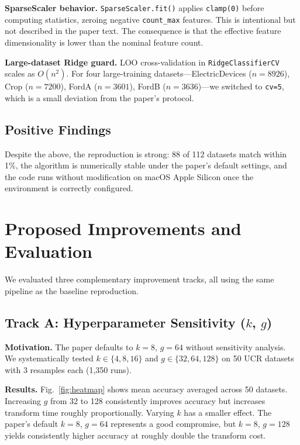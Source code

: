 \documentclass[conference]{IEEEtran}
\begin{document}
\textbf{SparseScaler behavior.}
\texttt{SparseScaler.fit()} applies \texttt{clamp(0)} before computing
statistics, zeroing negative \texttt{count\_max} features. This is
intentional but not described in the paper text. The consequence is that
the effective feature dimensionality is lower than the nominal feature count.

\textbf{Large-dataset Ridge guard.}
LOO cross-validation in \texttt{RidgeClassifierCV} scales as $O(n^2)$.
For four large-training datasets---ElectricDevices ($n{=}8926$), Crop
($n{=}7200$), FordA ($n{=}3601$), FordB ($n{=}3636$)---we switched to
\texttt{cv=5}, which is a small deviation from the paper's protocol.

\subsection{Positive Findings}

Despite the above, the reproduction is strong: 88 of 112 datasets match
within 1\%, the algorithm is numerically stable under the paper's default
settings, and the code runs without modification on macOS Apple Silicon
once the environment is correctly configured.

\section{Proposed Improvements and Evaluation}

We evaluated three complementary improvement tracks, all using the same
pipeline as the baseline reproduction.

\subsection{Track A: Hyperparameter Sensitivity ($k$, $g$)}

\textbf{Motivation.} The paper defaults to $k{=}8$, $g{=}64$ without
sensitivity analysis. We systematically tested $k \in \{4, 8, 16\}$ and
$g \in \{32, 64, 128\}$ on 50 UCR datasets with 3 resamples each (1,350
runs).

\textbf{Results.} Fig.~\ref{fig:heatmap} shows mean accuracy averaged
across 50 datasets. Increasing $g$ from 32 to 128 consistently improves
accuracy but increases transform time roughly proportionally. Varying $k$
has a smaller effect. The paper's default $k{=}8$, $g{=}64$ represents
a good compromise, but $k{=}8$, $g{=}128$ yields consistently higher
accuracy at roughly double the transform cost.
\end{document}
